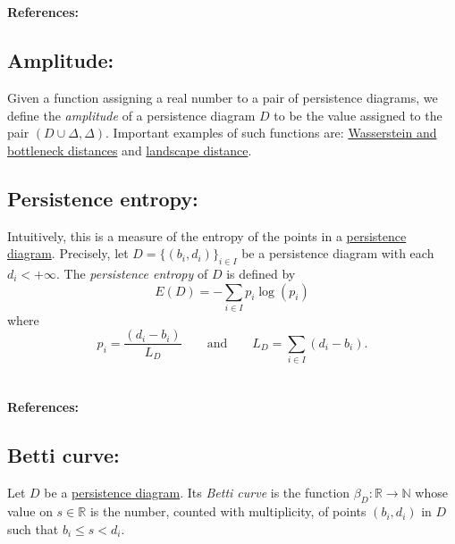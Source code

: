 \documentclass{amsart}
\begin{document}
	\paragraph{\\ References:} \cite{chazal2014stochastic}
	
	\subsection*{Amplitude:} \label{amplitude}
	
	Given a function assigning a real number to a pair of persistence diagrams, we define the \textit{amplitude} of a persistence diagram $D$ to be the value assigned to the pair $(D \cup \Delta, \Delta)$. Important examples of such functions are: \hyperref[wasserstein and bottleneck distance]{Wasserstein and bottleneck distances} and \hyperref[persistence landscape norm]{landscape distance}.
	
	\subsection*{Persistence entropy:} \label{persistence entropy}
	
	Intuitively, this is a measure of the entropy of the points in a \hyperref[persistence diagram]{persistence diagram}. Precisely, let $D = \{(b_i, d_i)\}_{i \in I}$ be a persistence diagram with each $d_i < +\infty$. The \textit{persistence entropy} of $D$ is defined by
	\begin{equation*}
	E(D) = - \sum_{i \in I} p_i \log(p_i)
	\end{equation*}
	where
	\begin{equation*}
	p_i = \frac{(d_i - b_i)}{L_D} \qquad \text{and} \qquad L_D = \sum_{i \in I} (d_i - b_i) . 
	\end{equation*}
	
	\paragraph{\\ References:} \cite{rucco2016characterisation}
	
	\subsection*{Betti curve:} \label{betti curve}
	
	Let $D$ be a \hyperref[persistence diagram]{persistence diagram}. Its \textit{Betti curve} is the function $\beta_D : \mathbb R \to \mathbb N$ whose value on $s \in \mathbb R$ is the number, counted with multiplicity, of points $(b_i,d_i)$ in $D$ such that $b_i \leq s <d_i$.
	
\end{document}
